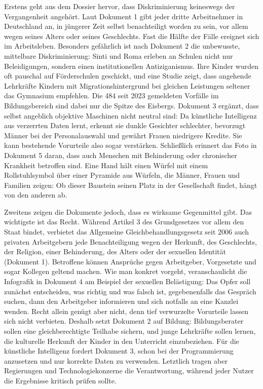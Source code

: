 \documentclass[11pt,a4paper]{article}
\begin{document}
Erstens geht aus dem Dossier hervor, dass Diskriminierung keineswegs der Vergangenheit angehört. Laut Dokument 1 gibt jeder dritte Arbeitnehmer in Deutschland an, in jüngerer Zeit selbst benachteiligt worden zu sein, vor allem wegen seines Alters oder seines Geschlechts. Fast die Hälfte der Fälle ereignet sich im Arbeitsleben. Besonders gefährlich ist nach Dokument 2 die unbewusste, mittelbare Diskriminierung: Sinti und Roma erleben an Schulen nicht nur Beleidigungen, sondern einen institutionellen Antiziganismus. Ihre Kinder wurden oft pauschal auf Förderschulen geschickt, und eine Studie zeigt, dass angehende Lehrkräfte Kindern mit Migrationshintergrund bei gleichen Leistungen seltener das Gymnasium empfehlen. Die 484 seit 2023 gemeldeten Vorfälle im Bildungsbereich sind dabei nur die Spitze des Eisbergs. Dokument 3 ergänzt, dass selbst angeblich objektive Maschinen nicht neutral sind: Da künstliche Intelligenz aus verzerrten Daten lernt, erkennt sie dunkle Gesichter schlechter, bevorzugt Männer bei der Personalauswahl und gewährt Frauen niedrigere Kredite. Sie kann bestehende Vorurteile also sogar verstärken. Schließlich erinnert das Foto in Dokument 5 daran, dass auch Menschen mit Behinderung oder chronischer Krankheit betroffen sind. Eine Hand hält einen Würfel mit einem Rollstuhlsymbol über einer Pyramide aus Würfeln, die Männer, Frauen und Familien zeigen: Ob dieser Baustein seinen Platz in der Gesellschaft findet, hängt von den anderen ab.

Zweitens zeigen die Dokumente jedoch, dass es wirksame Gegenmittel gibt. Das wichtigste ist das Recht. Während Artikel 3 des Grundgesetzes vor allem den Staat bindet, verbietet das Allgemeine Gleichbehandlungsgesetz seit 2006 auch privaten Arbeitgebern jede Benachteiligung wegen der Herkunft, des Geschlechts, der Religion, einer Behinderung, des Alters oder der sexuellen Identität (Dokument 1). Betroffene können Ansprüche gegen Arbeitgeber, Vorgesetzte und sogar Kollegen geltend machen. Wie man konkret vorgeht, veranschaulicht die Infografik in Dokument 4 am Beispiel der sexuellen Belästigung: Das Opfer soll zunächst entscheiden, was richtig und was falsch ist, gegebenenfalls das Gespräch suchen, dann den Arbeitgeber informieren und sich notfalls an eine Kanzlei wenden. Recht allein genügt aber nicht, denn tief verwurzelte Vorurteile lassen sich nicht verbieten. Deshalb setzt Dokument 2 auf Bildung: Bildungsberater sollen eine gleichberechtigte Teilhabe sichern, und junge Lehrkräfte sollen lernen, die kulturelle Herkunft der Kinder in den Unterricht einzubeziehen. Für die künstliche Intelligenz fordert Dokument 3, schon bei der Programmierung anzusetzen und nur korrekte Daten zu verwenden. Letztlich tragen aber Regierungen und Technologiekonzerne die Verantwortung, während jeder Nutzer die Ergebnisse kritisch prüfen sollte.
\end{document}
